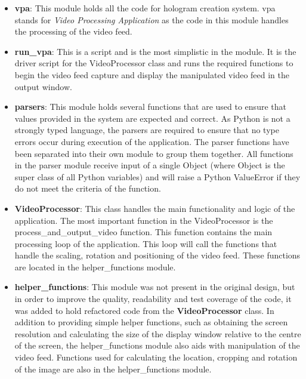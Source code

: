 \begin{itemize}
	\item \textbf{vpa}: This module holds all the code for hologram creation system. vpa stands for \textit{Video Processing Application} as the code in this module handles the processing of the video feed.

	\item \textbf{run\_vpa}: This is a script and is the most simplistic in the module. It is the driver script for the VideoProcessor class and runs the required functions to begin the video feed capture and display the manipulated video feed in the output window.

	\item \textbf{parsers}: This module holds several functions that are used to ensure that values provided in the system are expected and correct. As Python is not a strongly typed language, the parsers are required to ensure that no type errors occur during execution of the application. The parser functions have been separated into their own module to group them together. All functions in the parser module receive input of a single Object (where Object is the super class of all Python variables) and will raise a Python ValueError if they do not meet the criteria of the function.

	\item \textbf{VideoProcessor}: This class handles the main functionality and logic of the application. The most important function in the VideoProcessor is the process\_and\_output\_video function. This function contains the main processing loop of the application. This loop will call the functions that handle the scaling, rotation and positioning of the video feed. These functions are located in the helper\_functions module.  

	\item \textbf{helper\_functions}: This module was not present in the original design, but in order to improve the quality, readability and test coverage of the code, it was added to hold refactored code from the \textbf{VideoProcessor} class. In addition to providing simple helper functions, such as obtaining the screen resolution and calculating the size of the display window relative to the centre of the screen, the helper\_functions module also aids with manipulation of the video feed. Functions used for calculating the location, cropping and rotation of the image are also in the helper\_functions module.

\end{itemize}

